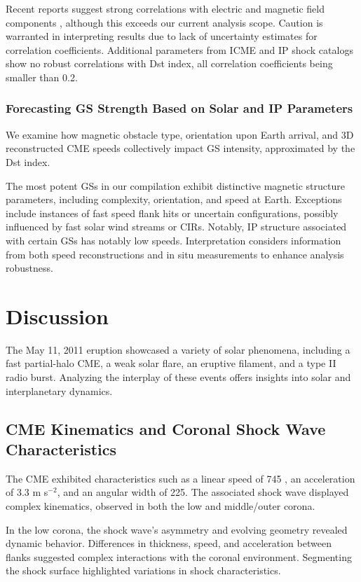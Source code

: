 Recent reports suggest strong correlations with electric and magnetic field components \citep{echer_2022}, although this exceeds our current analysis scope. Caution is warranted in interpreting results due to lack of uncertainty estimates for correlation coefficients. Additional parameters from ICME and IP shock catalogs show no robust correlations with Dst index, all correlation coefficients being smaller than 0.2.

\subsubsection{Forecasting GS Strength Based on Solar and IP Parameters}
We examine how magnetic obstacle type, orientation upon Earth arrival, and 3D reconstructed CME speeds collectively impact GS intensity, approximated by the Dst index.

The most potent GSs in our compilation exhibit distinctive magnetic structure parameters, including complexity, orientation, and speed at Earth. Exceptions include instances of fast speed flank hits or uncertain configurations, possibly influenced by fast solar wind streams or CIRs. Notably, IP structure associated with certain GSs has notably low speeds.
Interpretation considers information from both speed reconstructions and in situ measurements to enhance analysis robustness.

\section{Discussion}
The May 11, 2011 eruption showcased a variety of solar phenomena, including a fast partial-halo CME, a weak solar flare, an eruptive filament, and a type II radio burst. Analyzing the interplay of these events offers insights into solar and interplanetary dynamics.

\subsection{CME Kinematics and Coronal Shock Wave Characteristics}
The CME exhibited characteristics such as a linear speed of 745 \kms, an acceleration of 3.3 m s$^{-2}$, and an angular width of 225\degree. The associated shock wave displayed complex kinematics, observed in both the low and middle/outer corona.

In the low corona, the shock wave's asymmetry and evolving geometry revealed dynamic behavior. Differences in thickness, speed, and acceleration between flanks suggested complex interactions with the coronal environment. Segmenting the shock surface highlighted variations in shock characteristics.

